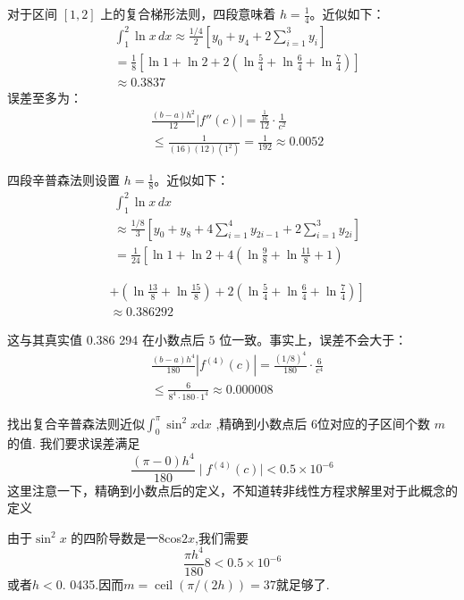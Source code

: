 \documentclass[UTF8,5pt,a4paper]{ctexart} %
\begin{document}
\begin{multicols}{4}
    对于区间 $[1,2]$ 上的复合梯形法则，四段意味着 $h = \frac{1}{4}$。近似如下：
    $$\begin{aligned}
    &\int_{1}^{2}\ln x \, dx \approx \frac{1/4}{2}\left[y_{0} + y_{4} + 2\sum_{i=1}^{3}y_{i}\right] \\
    &= \frac{1}{8}\left[\ln 1 + \ln 2 + 2(\ln \frac{5}{4} + \ln \frac{6}{4} + \ln \frac{7}{4})\right]\\
    & \approx 0.3837
\end{aligned}
    $$
    误差至多为：
    $$
    \begin{aligned}
    &\frac{(b-a)h^2}{12} \left| f''(c) \right|  = \frac{\frac{1}{16}}{12} \cdot \frac{1}{c^2} \\
    &\leqslant \frac{1}{(16)(12)(1^2)} = \frac{1}{192} \approx 0.0052
\end{aligned}
    $$
    
    四段辛普森法则设置 $h = \frac{1}{8}$。近似如下：
    $$
    \begin{aligned}
   & \int_{1}^{2}\ln x \, dx \\
    &\approx \frac{1/8}{3}\left[y_{0} + y_{8} + 4\sum_{i=1}^{4}y_{2i-1} + 2\sum_{i=1}^{3}y_{2i}\right] \\
    &= \frac{1}{24}\left[\ln 1 + \ln 2 + 4(\ln \frac{9}{8} + \ln \frac{11}{8} + 1)\right.        
\end{aligned}
    $$

    $$
    \begin{aligned}
    &\left. + (\ln \frac{13}{8} + \ln \frac{15}{8}) + 2(\ln \frac{5}{4} + \ln \frac{6}{4} + \ln \frac{7}{4})\right]\\
    & \approx 0.386292  
\end{aligned} $$
    
    这与其真实值 0.386 294 在小数点后 5 位一致。事实上，误差不会大于：
    $$\begin{aligned}
    &\frac{(b-a)h^4}{180} \left| f^{(4)}(c) \right| = \frac{(1/8)^4}{180} \cdot \frac{6}{c^4} \\
    &\leqslant \frac{6}{8^4 \cdot 180 \cdot 1^4} \approx 0.000008
\end{aligned}
    $$


找出复合辛普森法则近似$\int _0^\pi \sin ^2x$d$x$ ,精确到小数点后 6位对应的子区间个数 $m$ 的值.
我们要求误差满足
$$\frac{(\pi-0)h^4}{180}\mid f^{(4)}(c)\mid<0.5\times10^{-6}$$
这里注意一下，精确到小数点后的定义，不知道转非线性方程求解里对于此概念的定义

由于$\sin^2x$ 的四阶导数是一8cos$2x$,我们需要
$$\frac{\pi h^4}{180}8<0.5\times10^{-6}$$
或者$h<0.$ 0435.因而$m=\operatorname{ceil}(\pi/(2h))=37$就足够了.

\end{multicols}
\end{document}
